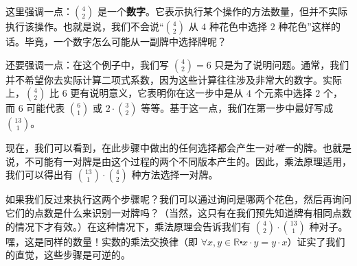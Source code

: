 \begin{example}[一对]
    这里强调一点：${4 \choose 2}$ 是一个\textbf{数字}。它表示执行某个操作的方法数量，但并不实际执行该操作。也就是说，我们不会说``${4 \choose 2}$ 从 $4$ 种花色中选择 $2$ 种花色''这样的话。毕竟，一个数字怎么可能从一副牌中选择牌呢？

    还要强调一点：在这个例子中，我们写 ${4 \choose 2} = 6$ 只是为了说明问题。通常，我们并不希望你去实际计算二项式系数，因为这些计算往往涉及非常大的数字。实际上，${4 \choose 2}$ 比 $6$ 更有说明意义，它表明你在这一步中是从 $4$ 个元素中选择 $2$ 个，而 $6$ 可能代表 ${6 \choose 1}$ 或 $2 \cdot {3 \choose 2}$ 等等。基于这一点，我们在第一步中最好写成 ${13 \choose 1}$。

    现在，我们可以看到，在此步骤中做出的任何选择都会产生一对\emph{唯一}的牌。也就是说，不可能有一对牌是由这个过程的两个不同版本产生的。因此，乘法原理适用，我们可以得出有 ${13 \choose 1} \cdot {4 \choose 2}$ 种方法选择一对牌。

    如果我们反过来执行这两个步骤呢？我们可以通过询问是哪两个花色，然后再询问它们的点数是什么来识别一对牌吗？（当然，这只有在我们预先知道牌有相同点数的情况下才有效。）在这种情况下，乘法原理会告诉我们有 ${4 \choose 2} \cdot {13 \choose 1}$ 种对子。嘿，这是同样的数量！实数的乘法交换律（即 $\forall x, y \in \mathbb{R} \centerdot x \cdot y = y \cdot x$）证实了我们的直觉，这些步骤是可逆的。


\end{example}
